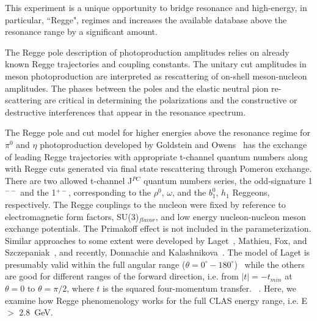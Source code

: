 \documentclass[aps,prc,twocolumn,floatfix,showpacs,preprintnumbers,amsmath,amssymb,superscriptaddress]{revtex4-1}
\begin{document}
This experiment is a unique opportunity to bridge resonance and 
high-energy, in particular, ``Regge", regimes and increases the
available database above the resonance range by a significant amount.




The Regge pole description of photoproduction amplitudes relies on 
already known Regge 
trajectories and coupling constants. The unitary cut amplitudes in meson
photoproduction are interpreted as rescattering of on-shell meson-nucleon amplitudes.  
The phases between the poles and the elastic neutral 
pion re-scattering 
are critical in determining the polarizations and the constructive or destructive interferences that appear in the resonance spectrum.

The Regge pole and cut model for higher energies above the
resonance regime for $\pi^0$ and $\eta$ photoproduction developed by Goldstein 
and Owens~\cite{Goldstein} has the exchange of leading Regge 
trajectories with appropriate t-channel quantum numbers along 
with Regge cuts generated via 
final state rescattering 
through Pomeron exchange. There are two allowed t-channel J$^{PC}$ 
quantum numbers series, the odd-signature 1$^{--}$ and the 1$^{+-}$, 
corresponding to the $\rho^0$, $\omega$, and the $b^0_1$, $h_1$ 
Reggeons, respectively. The Regge couplings to the nucleon were fixed by 
reference to electromagnetic form factors, SU(3)$_{flavor}$, and low 
energy nucleon-nucleon meson exchange potentials.  The Primakoff 
effect is not included in the parameterization.  Similar approaches 
to some extent were developed by Laget~\cite{Laget}, Mathieu, 
Fox, and Szczepaniak~\cite{Mathieu}, and recently, Donnachie and 
Kalashnikova~\cite{Donnachie}.  
The model of Laget is presumably 
valid within the full angular range ($\theta = 
0^\circ - 180^\circ$)~\cite{Laget} while the others are 
good for different ranges of the forward direction, i.e. from $|t| = 
-t_{min}$ at $\theta=0$ to $\theta=\pi/2$, where $t$ is the squared four-momentum 
transfer.
~\cite{Goldstein,Mathieu,Donnachie}. Here, we examine
how Regge phenomenology works for the full CLAS energy range, i.e.
E $>$ 2.8~GeV.
\end{document}
